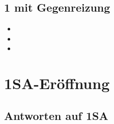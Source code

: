 \section{1\M{} mit Gegenreizung} \label{sec:1M mit Gegenreizung}

\begin{itemize}
	\item {}
	\item {}
	\item {}
\end{itemize}

\chapter{1SA-Eröffnung} \label{ch:1SA}

\section{Antworten auf 1SA\rs}

